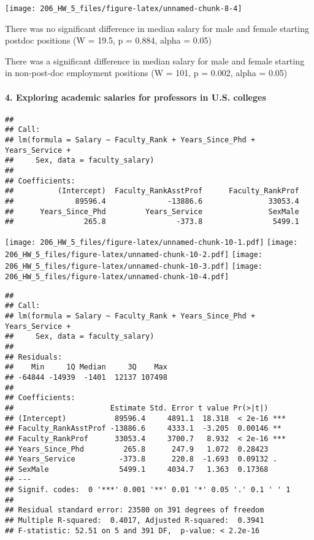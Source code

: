 \documentclass[]{article}
\let\oldparagraph\paragraph
\renewcommand{\paragraph}[1]{\oldparagraph{#1}\mbox{}}
\begin{document}
\begin{center}\texttt{[image: 206\_HW\_5\_files/figure-latex/unnamed-chunk-8-4]} \end{center}

There was no significant difference in median salary for male and female
starting postdoc positions (W = 19.5, p = 0.884, alpha = 0.05)

There was a significant difference in median salary for male and female
starting in non-post-doc employment positions (W = 101, p = 0.002, alpha
= 0.05)

\paragraph{4. Exploring academic salaries for professors in U.S.
colleges}\label{exploring-academic-salaries-for-professors-in-u.s.-colleges}

\begin{verbatim}
## 
## Call:
## lm(formula = Salary ~ Faculty_Rank + Years_Since_Phd + Years_Service + 
##     Sex, data = faculty_salary)
## 
## Coefficients:
##          (Intercept)  Faculty_RankAsstProf      Faculty_RankProf  
##              89596.4              -13886.6               33053.4  
##      Years_Since_Phd         Years_Service               SexMale  
##                265.8                -373.8                5499.1
\end{verbatim}

\texttt{[image: 206\_HW\_5\_files/figure-latex/unnamed-chunk-10-1.pdf]}
\texttt{[image: 206\_HW\_5\_files/figure-latex/unnamed-chunk-10-2.pdf]}
\texttt{[image: 206\_HW\_5\_files/figure-latex/unnamed-chunk-10-3.pdf]}
\texttt{[image: 206\_HW\_5\_files/figure-latex/unnamed-chunk-10-4.pdf]}

\begin{verbatim}
## 
## Call:
## lm(formula = Salary ~ Faculty_Rank + Years_Since_Phd + Years_Service + 
##     Sex, data = faculty_salary)
## 
## Residuals:
##    Min     1Q Median     3Q    Max 
## -64844 -14939  -1401  12137 107498 
## 
## Coefficients:
##                      Estimate Std. Error t value Pr(>|t|)    
## (Intercept)           89596.4     4891.1  18.318  < 2e-16 ***
## Faculty_RankAsstProf -13886.6     4333.1  -3.205  0.00146 ** 
## Faculty_RankProf      33053.4     3700.7   8.932  < 2e-16 ***
## Years_Since_Phd         265.8      247.9   1.072  0.28423    
## Years_Service          -373.8      220.8  -1.693  0.09132 .  
## SexMale                5499.1     4034.7   1.363  0.17368    
## ---
## Signif. codes:  0 '***' 0.001 '**' 0.01 '*' 0.05 '.' 0.1 ' ' 1
## 
## Residual standard error: 23580 on 391 degrees of freedom
## Multiple R-squared:  0.4017, Adjusted R-squared:  0.3941 
## F-statistic: 52.51 on 5 and 391 DF,  p-value: < 2.2e-16
\end{verbatim}
\end{document}
